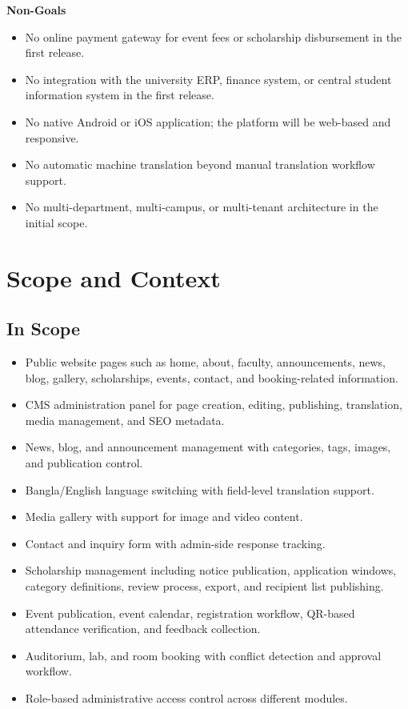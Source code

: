 \documentclass[12pt,a4paper]{article}
\begin{document}
\textbf{Non-Goals}
\begin{itemize}[nosep]
\item No online payment gateway for event fees or scholarship disbursement in the first release.
\item No integration with the university ERP, finance system, or central student information system in the first release.
\item No native Android or iOS application; the platform will be web-based and responsive.
\item No automatic machine translation beyond manual translation workflow support.
\item No multi-department, multi-campus, or multi-tenant architecture in the initial scope.
\end{itemize}

\section{Scope and Context}

\subsection{In Scope}

\begin{itemize}[nosep]
\item Public website pages such as home, about, faculty, announcements, news, blog, gallery, scholarships, events, contact, and booking-related information.
\item CMS administration panel for page creation, editing, publishing, translation, media management, and SEO metadata.
\item News, blog, and announcement management with categories, tags, images, and publication control.
\item Bangla/English language switching with field-level translation support.
\item Media gallery with support for image and video content.
\item Contact and inquiry form with admin-side response tracking.
\item Scholarship management including notice publication, application windows, category definitions, review process, export, and recipient list publishing.
\item Event publication, event calendar, registration workflow, QR-based attendance verification, and feedback collection.
\item Auditorium, lab, and room booking with conflict detection and approval workflow.
\item Role-based administrative access control across different modules.
\end{itemize}
\end{document}
